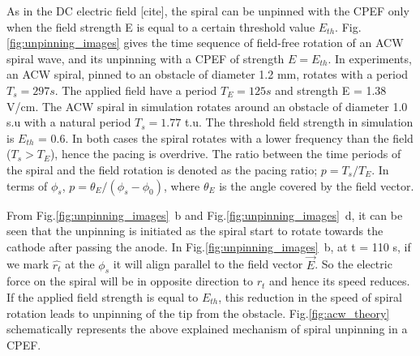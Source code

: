 \documentclass[%
 preprint,
 amsmath,amssymb,
 aps,
]{revtex4-2}
\begin{document}
As in the DC electric field [cite], the spiral can be unpinned with the CPEF only when the field strength E is equal to a certain threshold value $E_{th}$.
Fig.\ref{fig:unpinning_images} gives the time sequence of field-free rotation of an ACW spiral wave, and its unpinning with a CPEF of strength $E = E_{th}$.
In experiments, an ACW spiral, pinned to an obstacle of diameter 1.2 mm, rotates with a period $T_{s} = 297 s$. The applied field have a period $T_{E} = 125 s$ and strength E = 1.38 V/cm. The ACW spiral in simulation rotates around an obstacle of diameter 1.0 s.u with a natural period $T_{s} = 1.77$ t.u. The threshold field strength in simulation is $E_{th}$ = 0.6. In both cases the spiral rotates with a lower frequency than the field ($T_{s} > T_{E}$), hence the pacing is overdrive. The ratio between the time periods of the spiral and the field rotation is denoted as the pacing ratio; $p = T_{s}/T_{E}$. In terms of $\phi_s$, $p = \theta_{E}/(\phi_{s} - \phi_{0})$, where $\theta_{E}$ is the angle covered by the field vector.

From Fig.\ref{fig:unpinning_images}~b and Fig.\ref{fig:unpinning_images}~d, it can be seen that the unpinning is initiated as the spiral start to rotate towards the cathode after passing the anode. 
In Fig.\ref{fig:unpinning_images}~b, at t = 110 s, if we mark $\hat{r_t}$ at the $\phi_{s}$ it will align parallel to the field vector $\vec{E}$. So the electric force on the spiral will be in opposite direction to $\hat{r_t}$ and hence its speed reduces. If the applied field strength is equal to $E_{th}$, this reduction in the speed of spiral rotation leads to unpinning of the tip from the obstacle. Fig.\ref{fig:acw_theory} schematically represents the above explained mechanism of spiral unpinning in a CPEF.
\end{document}
